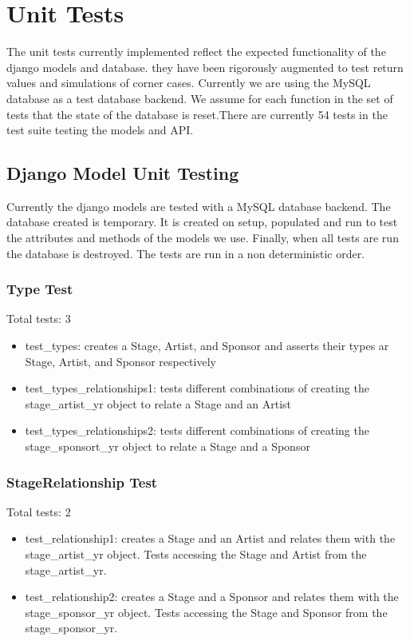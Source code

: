 \documentclass[12pt,english]{scrartcl}
\begin{document}
\section{Unit Tests}

The unit tests currently implemented reflect the expected functionality of the django models and database. they have been rigorously
augmented to test return values and simulations of corner cases. Currently we are using the MySQL database as a test database backend. 
We assume for each function in the set of tests that the state of the database is reset.There are currently 54 tests in the test suite testing the models and API.

\subsection{Django Model Unit Testing}
Currently the django models are tested with a MySQL database backend. The database created is temporary. It is created on setup, populated 
and run to test the attributes and methods of the models we use. Finally, when all tests are run the database is destroyed.
The tests are run in a non deterministic order. 

\subsubsection{Type Test}
Total tests: 3 \\

\begin{itemize}
 \item test\_types: creates a Stage, Artist, and Sponsor and asserts their types ar Stage, Artist, and Sponsor respectively
 \item test\_types\_relationships1: tests different combinations of creating the stage\_artist\_yr object to relate a Stage and an Artist
 \item test\_types\_relationships2: tests different combinations of creating the stage\_sponsort\_yr object to relate a Stage and a Sponsor
\end{itemize}

\subsubsection{StageRelationship Test}
Total tests: 2 \\

\begin{itemize}
 \item test\_relationship1: creates a Stage and an Artist and relates them with the stage\_artist\_yr object. Tests accessing the Stage and Artist from the stage\_artist\_yr.
 \item test\_relationship2: creates a Stage and a Sponsor and relates them with the stage\_sponsor\_yr object. Tests accessing the Stage and Sponsor from the stage\_sponsor\_yr.
\end{itemize}
\end{document}
